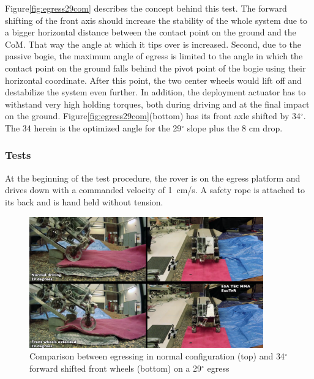 \documentclass[a4paper,twocolumn]{esapub2005} %
\begin{document}
Figure\ref{fig:egress29com} describes the concept behind this test. The
forward shifting of the front axis should increase the stability of the
whole system due to a bigger horizontal distance between the contact point
on the ground and the CoM. That way the angle at which it tips over is
increased. Second, due to the passive bogie, the maximum angle of egress is
limited to the angle in which the contact point on the ground falls behind
the pivot point of the bogie using their horizontal coordinate. After this
point, the two center wheels would lift off and destabilize the system even
further. In addition, the deployment actuator has to withstand very high
holding torques, both during driving and at the final impact on the ground.
Figure\ref{fig:egress29com}(bottom) has its front axle shifted by
34$^\circ$. The 34 herein is the optimized angle for the 29$^\circ$ slope
plus the 8 cm drop. 



\subsubsection{Tests}

At the beginning of the test procedure, the rover is on the egress platform and
drives down with a commanded velocity of 1~\unit{cm/s}. A safety rope is
attached to its back and is hand held without tension. 

\begin{figure}[h!] \centering
    \includegraphics[width=0.9\textwidth]{egress29.png}	\caption{Comparison
    between egressing in normal configuration (top) and 34$^{\circ}$ forward
    shifted front wheels (bottom) on a 29$^{\circ}$ egress} \label{fig:egress29}
\end{figure}
\end{document}
